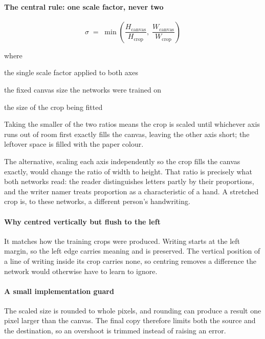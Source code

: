 \paragraph{The central rule: one scale factor, never two}

\begin{equation}
\sigma \;=\; \min\!\left(\frac{H_{\mathrm{canvas}}}{H_{\mathrm{crop}}},\; \frac{W_{\mathrm{canvas}}}{W_{\mathrm{crop}}}\right)
\end{equation}

\noindent where
\begin{description}[leftmargin=2.4em,style=nextline,font=\normalfont\ttfamily]\setlength\itemsep{1pt}
  \item[{$\sigma$}] \normalfont the single scale factor applied to both axes
  \item[{$H_{\mathrm{canvas}},\, W_{\mathrm{canvas}}$}] \normalfont the fixed canvas size the networks were trained on
  \item[{$H_{\mathrm{crop}},\, W_{\mathrm{crop}}$}] \normalfont the size of the crop being fitted
\end{description}
Taking the smaller of the two ratios means the crop is scaled until whichever axis runs out of room first exactly fills the canvas, leaving the other axis short; the leftover space is filled with the paper colour.

The alternative, scaling each axis independently so the crop fills the canvas exactly, would change the ratio of width to height. That ratio is precisely what both networks read: the reader distinguishes letters partly by their proportions, and the writer namer treats proportion as a characteristic of a hand. A stretched crop is, to these networks, a different person's handwriting.


\paragraph{Why centred vertically but flush to the left}
It matches how the training crops were produced. Writing starts at the left margin, so the left edge carries meaning and is preserved. The vertical position of a line of writing inside its crop carries none, so centring removes a difference the network would otherwise have to learn to ignore.


\paragraph{A small implementation guard}
The scaled size is rounded to whole pixels, and rounding can produce a result one pixel larger than the canvas. The final copy therefore limits both the source and the destination, so an overshoot is trimmed instead of raising an error.


